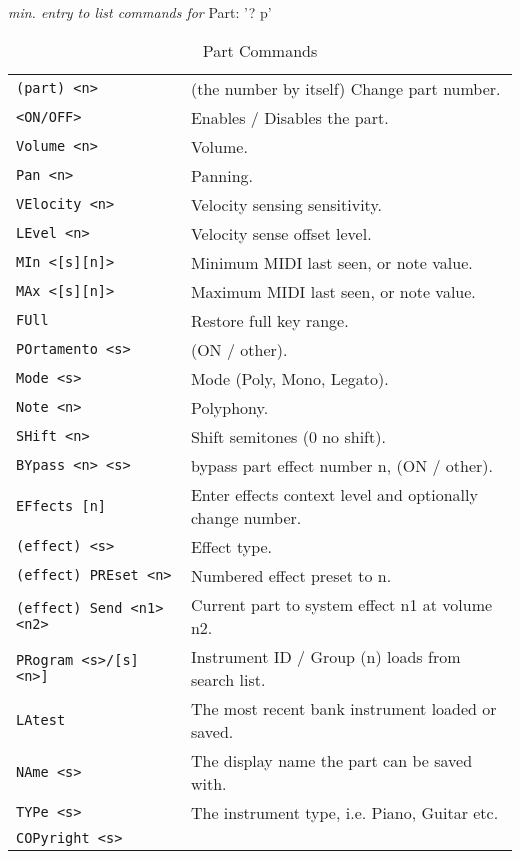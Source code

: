 \textsl{min. entry to list commands for} Part: '? p'

\begin{center}
\begin{longtable}[l]{ ll}
\caption[Part Commands]{Part Commands} \\
   \label{table:yoshimi_part_commands}
\texttt{(part) <n>} &
   (the number by itself) Change part number.  \\
\texttt{<ON/OFF>} &
   Enables / Disables the part. \\
\texttt{Volume <n>} &
   Volume.  \\
\texttt{Pan <n>} &
   Panning.\\
\texttt{VElocity <n>} &
   Velocity sensing sensitivity. \\
\texttt{LEvel <n>} &
   Velocity sense offset level.  \\
\texttt{MIn <[s][n]>} &
   Minimum MIDI last seen, or note value.   \\
\texttt{MAx <[s][n]>} &
   Maximum MIDI last seen, or note value.   \\
\texttt{FUll} &
   Restore full key range.   \\
\texttt{POrtamento <s>} &
   (ON / other).   \\
\texttt{Mode <s>} &
   Mode (Poly, Mono, Legato). \\
\texttt{Note <n>} &
   Polyphony.  \\
\texttt{SHift <n>} &
   Shift semitones (0 no shift). \\
\texttt{BYpass <n> <s>} &
   bypass part effect number n, (ON / other).  \\
\texttt{EFfects [n]} &
   Enter effects context level and optionally change number.  \\
 \texttt{(effect) <s>} &
   Effect type.   \\
 \texttt{(effect) PREset <n>} &
   Numbered effect preset to n. \\
 \texttt{(effect) Send <n1> <n2>} &
   Current part to system effect n1 at volume n2. \\
\texttt{PRogram <s>/[s] <n>]} &
   Instrument ID / Group (n) loads from search list. \\
\texttt{LAtest} &
   The most recent bank instrument loaded or saved. \\
\texttt{NAme <s>} &
   The display name the part can be saved with. \\
\texttt{TYPe <s>} &
   The instrument type, i.e. Piano, Guitar etc. \\
\texttt{COPyright <s>} &

\end{longtable}
\end{center}
